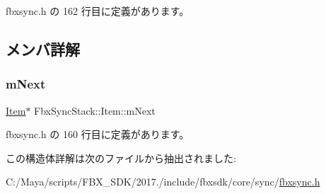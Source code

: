 fbxsync.\+h の 162 行目に定義があります。



\subsection{メンバ詳解}
\mbox{\label{struct_fbx_sync_stack_1_1_item_a8534ccca4fccd6b9ba2a689985e35430}} 
\subsubsection{\texorpdfstring{m\+Next}{mNext}}
{\footnotesize\ttfamily \hyperlink{struct_fbx_sync_stack_1_1_item}{Item}$\ast$ Fbx\+Sync\+Stack\+::\+Item\+::m\+Next}



 fbxsync.\+h の 160 行目に定義があります。



この構造体詳解は次のファイルから抽出されました\+:\begin{DoxyCompactItemize}
\item 
C\+:/\+Maya/scripts/\+F\+B\+X\+\_\+\+S\+D\+K/2017./include/fbxsdk/core/sync/\hyperlink{fbxsync_8h}{fbxsync.\+h}\end{DoxyCompactItemize}
